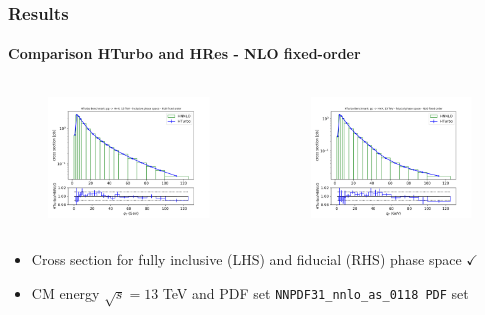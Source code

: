 \documentclass[aspectratio=43]{beamer}
\begin{document}
\begin{frame}
	
	\frametitle{Results}
	\framesubtitle{Comparison HTurbo and HRes - NLO fixed-order}
	
	\footnotesize
	
	\begin{columns}
		
		
		\begin{figure}
			\includegraphics[width = 7cm]{plots/part3/chapter6/nnlo-fo-1.png}
		\end{figure}
		
		
		\begin{figure}
			\includegraphics[width = 7cm]{plots/part3/chapter6/nnlo-fo-fid-1.png}
		\end{figure}
		
	\end{columns}
	
	\begin{itemize}
		\item Cross section for fully inclusive (LHS) and fiducial (RHS) phase space {\color{darkgreen}$\checkmark$} 
		\item CM energy $\sqrt s = 13$ TeV and PDF set \texttt{NNPDF31\_nnlo\_as\_0118 PDF} set
	\end{itemize}

\end{frame}
\end{document}
